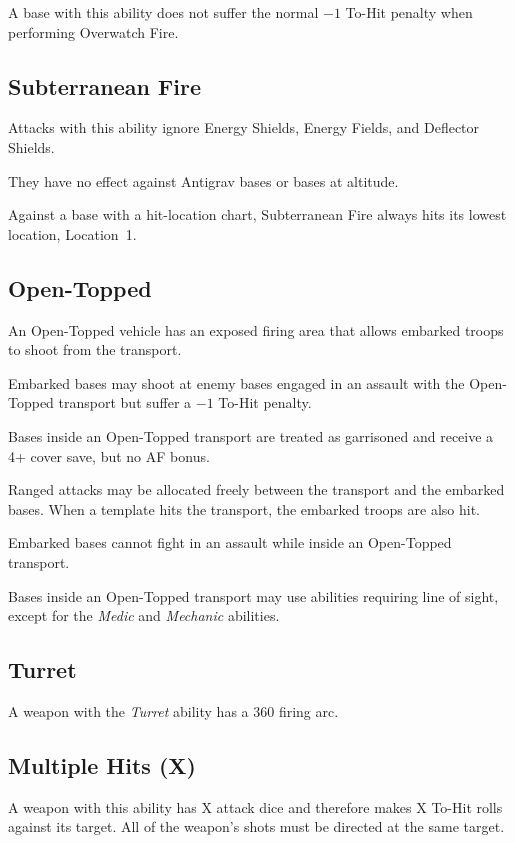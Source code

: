 A base with this ability does not suffer the normal $-1$ To-Hit penalty when performing Overwatch Fire.

\subsection{Subterranean Fire}

Attacks with this ability ignore Energy Shields, Energy Fields, and Deflector Shields.

They have no effect against Antigrav bases or bases at altitude.

Against a base with a hit-location chart, Subterranean Fire always hits its lowest location, Location~1.

\subsection{Open-Topped}

An Open-Topped vehicle has an exposed firing area that allows embarked troops to shoot from the transport.

Embarked bases may shoot at enemy bases engaged in an assault with the Open-Topped transport but suffer a $-1$ To-Hit penalty.

Bases inside an Open-Topped transport are treated as garrisoned and receive a 4+ cover save, but no AF bonus.

Ranged attacks may be allocated freely between the transport and the embarked bases. When a template hits the transport, the embarked troops are also hit.

Embarked bases cannot fight in an assault while inside an Open-Topped transport.

Bases inside an Open-Topped transport may use abilities requiring line of sight, except for the \textit{Medic} and \textit{Mechanic} abilities.

\subsection{Turret}

A weapon with the \textit{Turret} ability has a 360\textdegree{} firing arc.

\subsection{Multiple Hits (X)}

A weapon with this ability has X attack dice and therefore makes X To-Hit rolls against its target. All of the weapon's shots must be directed at the same target.

